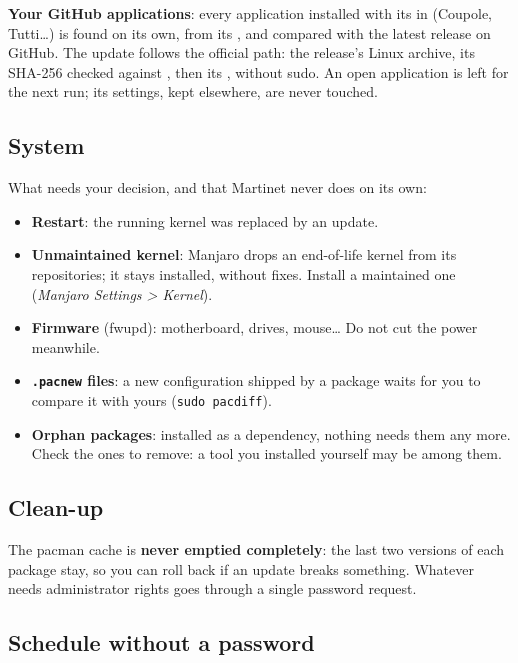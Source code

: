 \textbf{Your GitHub applications}: every application installed with its  in
 (Coupole, Tutti…) is found on its own, from its
, and compared with the latest release on GitHub. The update follows the
official path: the release's Linux archive, its SHA-256 checked against , then its
, without sudo. An open application is left for the next run; its settings,
kept elsewhere, are never touched.

\subsection{System}


What needs your decision, and that Martinet never does on its own:
\begin{itemize}
\item \textbf{Restart}: the running kernel was replaced by an update.
\item \textbf{Unmaintained kernel}: Manjaro drops an end-of-life kernel from its repositories; it stays
installed, without fixes. Install a maintained one (\textit{Manjaro Settings > Kernel}).
\item \textbf{Firmware} (fwupd): motherboard, drives, mouse… Do not cut the power meanwhile.
\item \textbf{\texttt{.pacnew} files}: a new configuration shipped by a package waits for you to
compare it with yours (\texttt{sudo pacdiff}).
\item \textbf{Orphan packages}: installed as a dependency, nothing needs them any more. Check the ones
to remove: a tool you installed yourself may be among them.
\end{itemize}

\subsection{Clean-up}


The pacman cache is \textbf{never emptied completely}: the last two versions of each package stay, so
you can roll back if an update breaks something. Whatever needs administrator rights goes through a
single password request.

\subsection{Schedule without a password}

